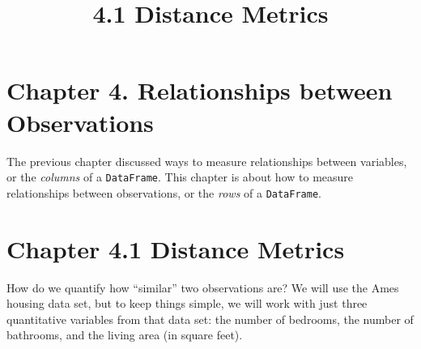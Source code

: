 \documentclass[11pt]{article}
\title{4.1 Distance Metrics}
\begin{document}
    
    
    \maketitle
    
    

    
    \hypertarget{chapter-4.-relationships-between-observations}{%
\section{Chapter 4. Relationships between
Observations}\label{chapter-4.-relationships-between-observations}}

The previous chapter discussed ways to measure relationships between
variables, or the \emph{columns} of a \texttt{DataFrame}. This chapter
is about how to measure relationships between observations, or the
\emph{rows} of a \texttt{DataFrame}.

\hypertarget{chapter-4.1-distance-metrics}{%
\section{Chapter 4.1 Distance
Metrics}\label{chapter-4.1-distance-metrics}}

How do we quantify how ``similar'' two observations are? We will use the
Ames housing data set, but to keep things simple, we will work with just
three quantitative variables from that data set: the number of bedrooms,
the number of bathrooms, and the living area (in square feet).
\end{document}
